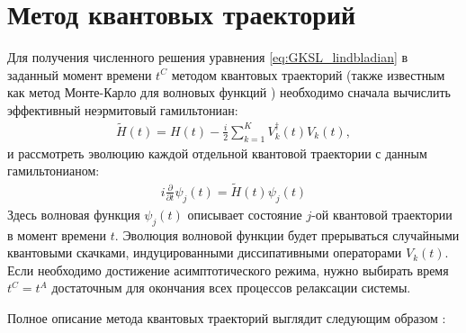 \section{Метод квантовых траекторий}\label{sec:ch1/sec2}
Для получения численного решения уравнения \cref{eq:GKSL_lindbladian} в заданный момент времени \(t^C\) методом квантовых траекторий (также известным как метод Монте-Карло для волновых функций \cite{Molmer1993}) необходимо сначала вычислить эффективный неэрмитовый гамильтониан:
\begin{equation}
\label{eq:H_nonhermit}
\begin{gathered}
\tilde{H}(t) = H(t) - \frac{i}{2} \sum_{k=1}^{K} V_k^\dagger(t) V_k(t),
\end{gathered}
\end{equation}
и рассмотреть эволюцию каждой отдельной квантовой траектории с данным гамильтонианом:
\begin{equation}
\label{eq:schrodinger}
\begin{gathered}
i \frac{\partial}{\partial t} \psi_j(t) = \tilde{H}(t) \psi_j(t)
\end{gathered}
\end{equation}
Здесь волновая функция \(\psi_j(t)\) описывает состояние \(j\)-ой квантовой траектории в момент времени \(t\). Эволюция волновой функции будет прерываться случайными квантовыми скачками, индуцированными диссипативными операторами \(V_k(t)\). Если необходимо достижение асимптотического режима, нужно выбирать время \(t^C = t^A\) достаточным для окончания всех процессов релаксации системы.

Полное описание метода квантовых траекторий выглядит следующим образом \cite{Volokitin2017}:

